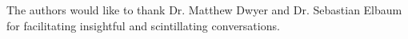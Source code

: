 \documentclass[prodmode,acmtecs]{acmsmall} %
\begin{document}
\maketitle














\begin{acks}
  The authors would like to thank Dr. Matthew Dwyer and Dr. Sebastian Elbaum for facilitating insightful and scintillating conversations.
\end{acks}
\newpage



\end{document}
